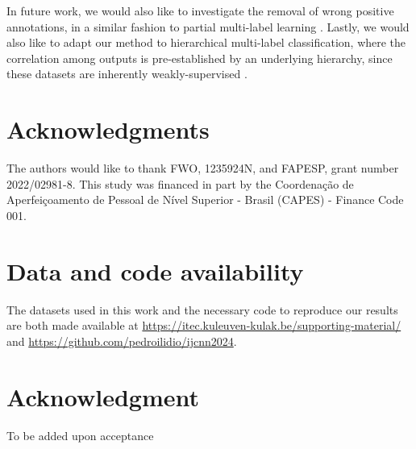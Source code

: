 \documentclass[conference,compsoc]{IEEEtran}
\begin{document}
%
%
%
%
In future work, we would also like to investigate the removal of wrong positive annotations, in a similar fashion to partial multi-label learning \cite{xie2018partial}. Lastly, we would also like to adapt our method to hierarchical multi-label classification, where the correlation among outputs is pre-established by an underlying hierarchy, since these datasets are inherently weakly-supervised \cite{nakano2019machine}. 



\section*{Acknowledgments}

The authors would like to thank FWO, 1235924N, and FAPESP, grant number 2022/02981-8. This study was financed in part by the Coordenação de
Aperfeiçoamento de Pessoal de Nível Superior - Brasil (CAPES) - Finance Code 001. 

\section*{Data and code availability}

The datasets used in this work and the necessary code to reproduce our results are both made available at \url{https://itec.kuleuven-kulak.be/supporting-material/} and \url{https://github.com/pedroilidio/ijcnn2024}.

\iffalse  %
    \ifCLASSOPTIONcompsoc
      \section*{Acknowledgments}
    \else
      \section*{Acknowledgment}
      To be added upon acceptance
    \fi
    
\end{document}
